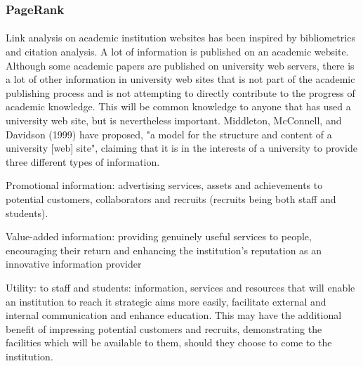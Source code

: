 \subsubsection{PageRank}
\paragraph{}
Link analysis on academic institution websites has been inspired by bibliometrics and citation
analysis. A lot of information is published on an academic website. Although some academic papers are published on university web servers, there is a lot of other information in university web sites that is not part of the academic publishing process and is not attempting to directly contribute to the progress of academic knowledge. This will be common knowledge to anyone that has used a university web site, but is nevertheless important. Middleton, McConnell, and Davidson (1999) have proposed, "a model for the structure and content of a university [web] site", claiming that it is in the interests of a university to provide three different types of information.
\begin{list}{}{}
\item Promotional information: advertising services, assets and achievements to potential customers, collaborators and recruits (recruits being both staff and students).
\item Value-added information: providing genuinely useful services to people, encouraging their return and enhancing the institution's reputation as an innovative information provider
\item Utility: to staff and students: information, services and resources that will enable an institution to reach it strategic aims more easily, facilitate external and internal communication and enhance education. This may have the additional benefit of impressing potential customers and recruits, demonstrating the facilities which will be available to them, should they choose to come to the institution.
\end{list}
